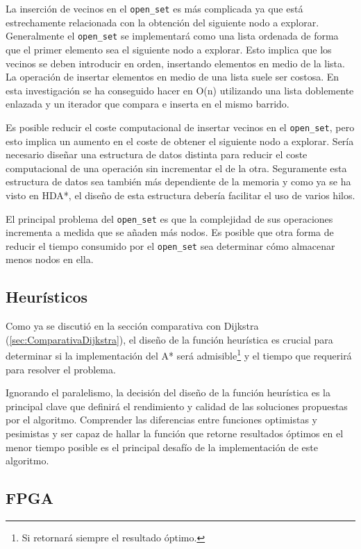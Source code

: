 La inserción de vecinos en el \lstinline{open_set} es más complicada
ya que está estrechamente relacionada con la obtención del siguiente nodo
a explorar.
Generalmente el \lstinline{open_set} se implementará como una lista ordenada
de forma que el primer elemento sea el siguiente nodo a explorar.
Esto implica que los vecinos se deben introducir en orden,
insertando elementos en medio de la lista.
La operación de insertar elementos en medio de una lista suele ser
costosa.
En esta investigación se ha conseguido hacer en O(n) utilizando
una lista doblemente enlazada y un iterador que compara e inserta
en el mismo barrido.

Es posible reducir el coste computacional de insertar vecinos en el \lstinline{open_set},
pero esto implica un aumento en el coste de obtener el siguiente nodo a explorar.
Sería necesario diseñar una estructura de datos distinta para
reducir el coste computacional de una operación sin incrementar el de la otra.
Seguramente esta estructura de datos sea también más dependiente de la memoria
y como ya se ha visto en HDA*, el diseño de esta estructura debería
facilitar el uso de varios hilos.

El principal problema del \lstinline{open_set} es que la complejidad de sus operaciones
incrementa a medida que se añaden más nodos.
Es posible que otra forma de reducir el tiempo consumido por el \lstinline{open_set}
sea determinar cómo almacenar menos nodos en ella.

\subsection{Heurísticos}

Como ya se discutió en la sección comparativa con Dijkstra (\ref{sec:ComparativaDijkstra}),
el diseño de la función heurística es crucial para determinar si la implementación
del A* será admisible\footnote{Si retornará siempre el resultado óptimo.}
y el tiempo que requerirá para resolver el problema.

Ignorando el paralelismo, la decisión del diseño de la función heurística
es la principal clave que definirá el rendimiento y calidad de las soluciones
propuestas por el algoritmo.
Comprender las diferencias entre funciones optimistas y pesimistas
y ser capaz de hallar la función que retorne resultados óptimos en
el menor tiempo posible es el principal desafío de la implementación de este algoritmo.

\pagebreak
\subsection{FPGA}

